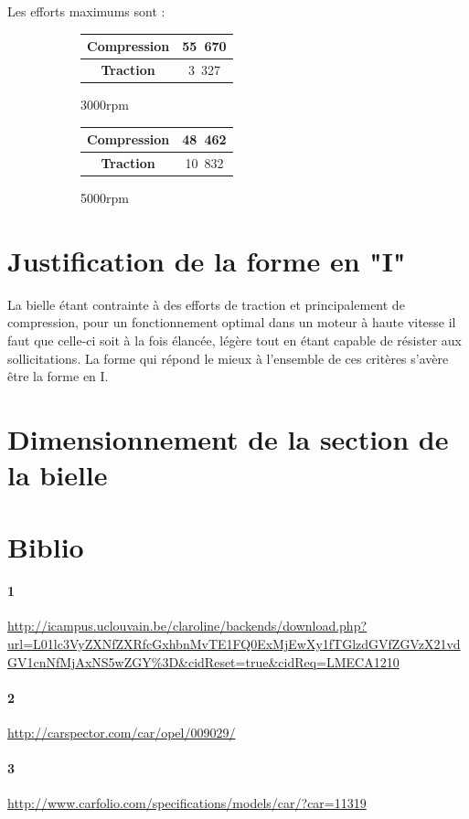 \documentclass{article}
\begin{document}
Les efforts maximums sont : 


\begin{figure}[h!]
\centering
    \begin{subfigure}[b]{0.45\textwidth}
    \begin{tabular}{|c|c|}
		\hline 
		\textbf{Compression} & \unit{55.670}{\kilo\newton} \\ 
		\hline 
		\textbf{Traction} & \unit{3.327}{\kilo\newton} \\ 
		\hline 
		\end{tabular} 
        \caption{\unit{3000}{rpm}}
    \end{subfigure}
    \begin{subfigure}[b]{0.45\textwidth}
        \begin{tabular}{|c|c|}
		\hline 
		\textbf{Compression} & \unit{48.462}{\kilo\newton} \\ 
		\hline 
		\textbf{Traction} & \unit{10.832}{\kilo\newton} \\ 
		\hline 
		\end{tabular} 
        \caption{\unit{5000}{rpm}}
    \end{subfigure}
    \caption{}
\end{figure}



\section{Justification de la forme en "I"}
La bielle étant contrainte à des efforts de traction et principalement de compression, pour un fonctionnement optimal dans un moteur à haute vitesse il faut que celle-ci soit à la fois élancée, légère tout en étant capable de résister aux sollicitations. La forme qui répond le mieux à l'ensemble de ces critères s'avère être la forme en I.



\section{Dimensionnement de la section de la bielle}

\section{Biblio}
\paragraph{1}
\url{http://icampus.uclouvain.be/claroline/backends/download.php?url=L01lc3VyZXNfZXRfcGxhbnMvTE1FQ0ExMjEwXy1fTGlzdGVfZGVzX21vdGV1cnNfMjAxNS5wZGY%3D&cidReset=true&cidReq=LMECA1210}
\paragraph{2}
\url{http://carspector.com/car/opel/009029/}
\paragraph{3}
\url{http://www.carfolio.com/specifications/models/car/?car=11319}
\end{document}
